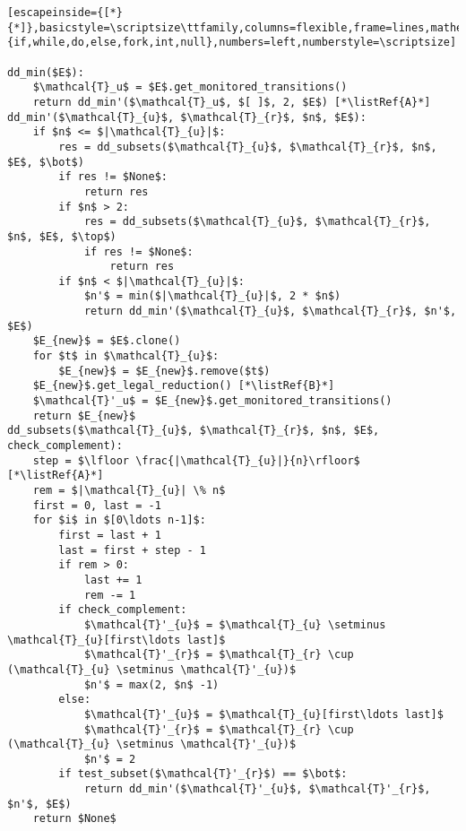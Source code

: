 \renewcommand{\ttdefault}{pcr}
\begin{lstlisting}[escapeinside={[*}{*]},basicstyle=\scriptsize\ttfamily,columns=flexible,frame=lines,mathescape=true,xleftmargin=5.0ex,keywordstyle=\textbf,morekeywords={if,while,do,else,fork,int,null},numbers=left,numberstyle=\scriptsize]

dd_min($E$):
	$\mathcal{T}_u$ = $E$.get_monitored_transitions()
	return dd_min'($\mathcal{T}_u$, $[ ]$, 2, $E$) [*\listRef{A}*]
dd_min'($\mathcal{T}_{u}$, $\mathcal{T}_{r}$, $n$, $E$):
	if $n$ <= $|\mathcal{T}_{u}|$:
		res = dd_subsets($\mathcal{T}_{u}$, $\mathcal{T}_{r}$, $n$, $E$, $\bot$)
		if res != $None$:
			return res
		if $n$ > 2:
			res = dd_subsets($\mathcal{T}_{u}$, $\mathcal{T}_{r}$, $n$, $E$, $\top$)
			if res != $None$:
				return res		
		if $n$ < $|\mathcal{T}_{u}|$:
			$n'$ = min($|\mathcal{T}_{u}|$, 2 * $n$)
			return dd_min'($\mathcal{T}_{u}$, $\mathcal{T}_{r}$, $n'$, $E$)
	$E_{new}$ = $E$.clone()	
	for $t$ in $\mathcal{T}_{u}$:
		$E_{new}$ = $E_{new}$.remove($t$)
	$E_{new}$.get_legal_reduction() [*\listRef{B}*]
	$\mathcal{T}'_u$ = $E_{new}$.get_monitored_transitions()	
	return $E_{new}$
dd_subsets($\mathcal{T}_{u}$, $\mathcal{T}_{r}$, $n$, $E$, check_complement):
	step = $\lfloor \frac{|\mathcal{T}_{u}|}{n}\rfloor$ [*\listRef{A}*]
	rem = $|\mathcal{T}_{u}| \% n$
	first = 0, last = -1
	for $i$ in $[0\ldots n-1]$:
		first = last + 1
		last = first + step - 1
		if rem > 0:
			last += 1
			rem -= 1
		if check_complement:
			$\mathcal{T}'_{u}$ = $\mathcal{T}_{u} \setminus \mathcal{T}_{u}[first\ldots last]$
			$\mathcal{T}'_{r}$ = $\mathcal{T}_{r} \cup (\mathcal{T}_{u} \setminus \mathcal{T}'_{u})$
			$n'$ = max(2, $n$ -1)
		else:
			$\mathcal{T}'_{u}$ = $\mathcal{T}_{u}[first\ldots last]$
			$\mathcal{T}'_{r}$ = $\mathcal{T}_{r} \cup (\mathcal{T}_{u} \setminus \mathcal{T}'_{u})$
			$n'$ = 2
		if test_subset($\mathcal{T}'_{r}$) == $\bot$:
			return dd_min'($\mathcal{T}'_{u}$, $\mathcal{T}'_{r}$, $n'$, $E$)						
	return $None$
\end{lstlisting}